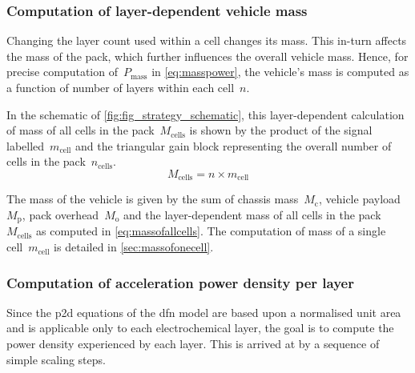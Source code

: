 \subsubsection*{Computation of layer-dependent vehicle mass}\label{sec:layerdependentvehiclemass}

Changing  the layer  count used  within a  cell changes  its mass.  This in-turn
affects the mass of the pack, which further influences the overall vehicle mass.
Hence, for  precise computation  of~$P_\text{mass}$ in  \cref{eq:masspower}, the
vehicle's  mass is  computed  as a  function  of number  of  layers within  each
cell~$n$.

In  the  schematic  of \cref{fig:fig_strategy_schematic},  this  layer-dependent
calculation of  mass of all cells  in the pack~$M_\text{cells}$ is  shown by the
product of  the signal  labelled~$m_\text{cell}$ and  the triangular  gain block
representing the overall number of cells in the pack~$n_\text{cells}$.
\begin{equation}\label{eq:massofallcells}
    M_\text{cells} = n \times m_\text{cell}
\end{equation}

The  mass of  the vehicle  is  given by  the sum  of chassis  mass~$M_\text{c}$,
vehicle payload~$M_\text{p}$, pack overhead~$M_\text{o}$ and the layer-dependent
mass   of   all   cells   in   the  pack~$M_\text{cells}$   as   computed   in
\cref{eq:massofallcells}.   The   computation  of   mass   of   a  single   cell~$m_\text{cell}$ is detailed in \cref{sec:massofonecell}.

\subsubsection*{Computation of acceleration power density per layer}

Since the \gls{p2d} equations of the \gls{dfn} model are based upon a normalised
unit area and is  applicable only to each electrochemical layer,  the goal is to
compute the  power density experienced  by each layer. This  is arrived at  by a
sequence of simple scaling steps.

